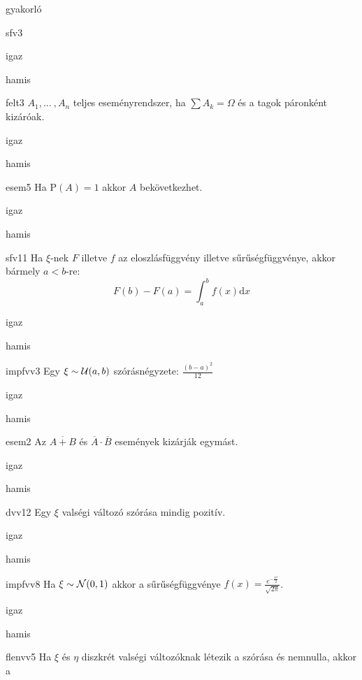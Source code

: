 \documentclass[12pt]{article}
\begin{document}
\begin{quiz}{gyakorló}
\begin{multi}[feedback={$f\ge 0$ fontos (monoton nemcsökkenő $F$-nek a deriváltja)}]{sfv3}
$$$$
\item igaz
\item* hamis
\end{multi}
\begin{multi}[feedback={Def.}]{felt3}
$A_1,{...\:},A_n$ teljes eseményrendszer, ha $\sum A_k=\Omega$ és a tagok páronként kizáróak.
\item* igaz
\item hamis
\end{multi}
\begin{multi}[feedback={Nókoment.}]{esem5}
Ha $\mathrm{P}(A)=1$ akkor $A$ bekövetkezhet.
\item* igaz
\item hamis
\end{multi}
\begin{multi}[feedback={Def.}]{sfv11}
Ha $\xi$-nek $F$ illetve $f$ az eloszlásfüggvény illetve sűrűségfüggvénye, akkor bármely $a<b$-re:
$$
F(b)-F(a)=\int_{a}^{b}f(x)\mathrm{d } x
$$
\item* igaz
\item hamis
\end{multi}
\begin{multi}[feedback={wiki}]{impfvv3}
Egy $\xi\sim {\cal U}(a,b)$ szórásnégyzete: $\frac{(b-a)^2}{12}$
\item* igaz
\item hamis
\end{multi}
\begin{multi}[feedback={de-Morgan azonosság}]{esem2}
Az $\overline{A+B}$ és $\overline{A} \cdot \overline{B}$ események kizárják egymást.
\item igaz
\item* hamis
\end{multi}
\begin{multi}[feedback={Egy konstans v.v-nak 0 a szórása.}]{dvv12}
Egy $\xi$ valségi változó szórása mindig pozitív.
\item igaz
\item* hamis
\end{multi}
\begin{multi}[feedback={Def.}]{impfvv8}
Ha $\xi\sim {\cal N}(0,1)$ akkor a sűrűségfüggvénye $f(x)=\frac{e^{-\frac{x^2}{2}}}{\sqrt{2\pi}}$.
\item* igaz
\item hamis
\end{multi}
\begin{multi}[feedback={Def.}]{flenvv5}
Ha $\xi$ és $\eta$ diszkrét valségi változóknak létezik a szórása és nemnulla, akkor a 

\end{multi}
\end{quiz}
\end{document}
